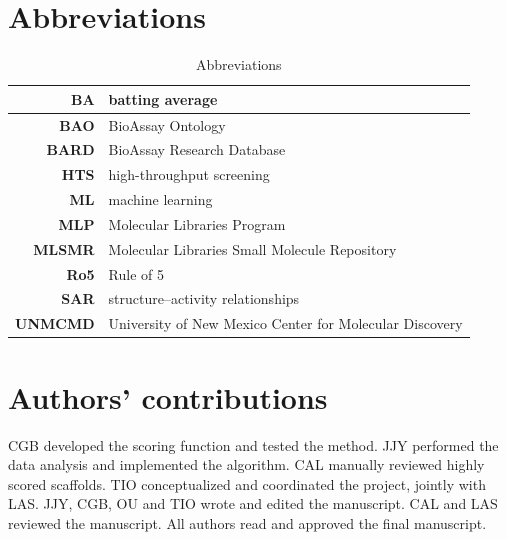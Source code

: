 \section{Abbreviations}

\begin{table}
\caption{Abbreviations}
\begin{tabular*}{\linewidth}{@{\extracolsep{\fill}}rl}
\hline
\textbf{BA} & batting average \\
\hline
\textbf{BAO} & BioAssay Ontology \\
\hline
\textbf{BARD} & BioAssay Research Database \\
\hline
\textbf{HTS} & high-throughput screening \\
\hline
\textbf{ML} & machine learning \\
\hline
\textbf{MLP} & Molecular Libraries Program \\
\hline
\textbf{MLSMR} & Molecular Libraries Small Molecule Repository \\
\hline
\textbf{Ro5} & Rule of 5 \\
\hline
\textbf{SAR} & structure–activity relationships \\
\hline
\textbf{UNMCMD} & University of New Mexico Center for Molecular Discovery \\
\hline
\end{tabular*}
\end{table}

\section{Authors’ contributions}

CGB developed the scoring function and tested the method. JJY performed the data analysis and implemented the algorithm. CAL manually reviewed highly scored scaffolds. TIO conceptualized and coordinated the project, jointly with LAS. JJY, CGB, OU and TIO wrote and edited the manuscript. CAL and LAS reviewed the manuscript. All authors read and approved the final manuscript.
